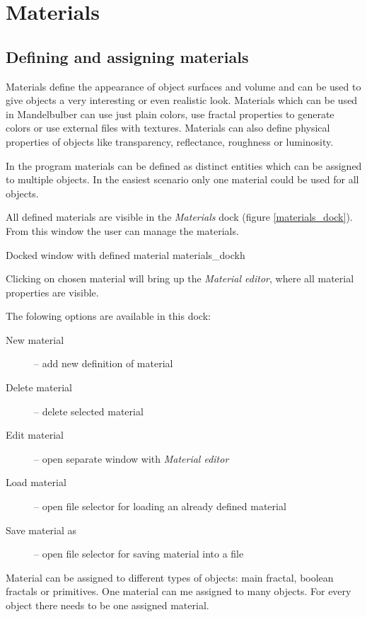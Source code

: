 \section{Materials}\label{materials}

\subsection{Defining and assigning materials}\label{defining-materials}

Materials define the appearance of object surfaces and volume and can be used to give objects a very interesting or even realistic look. Materials which can be used in Mandelbulber can use just plain colors, use fractal properties to generate colors or use external files with textures. Materials can also define physical properties of objects like transparency, reflectance, roughness or luminosity. 

In the program materials can be defined as distinct entities which can be assigned to multiple objects. In the easiest scenario only one material could be used for all objects.

All defined materials are visible in the \emph{Materials} dock (figure \ref{materials_dock}).
From this window the user can manage the materials.

{Docked window with defined material}
{materials_dock}{h}

Clicking on chosen material will bring up the \emph{Material editor}, where all material properties are visible.

The folowing options are available in this dock:

\begin{description}
		\item[New material] -- add new definition of material
		\item[Delete material] -- delete selected material
		\item[Edit material] -- open separate window with \emph{Material editor}
		\item[Load material] -- open file selector for loading an already defined material
		\item[Save material as] -- open file selector for saving material into a file
\end{description}

Material can be assigned to different types of objects: main fractal, boolean fractals or primitives. One material can me assigned to many objects. For every object there needs to be one assigned material.


